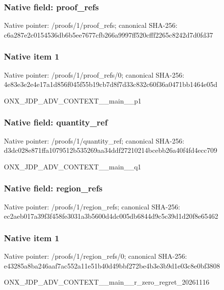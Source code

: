 \documentclass[10pt,a4paper]{article}
\begin{document}
\subsubsection{Native field: proof\_\allowbreak{}refs}
Native pointer: /proofs/1/proof\_\allowbreak{}refs; canonical SHA-256: c6a287e2c0154536db6b5ee7677cfb266a9997ff520cfff2265c8242d7d0fd37

\subsubsection{Native item 1}
Native pointer: /proofs/1/proof\_\allowbreak{}refs/0; canonical SHA-256: 4e83e3e2e4e17a1d856f045f55b19cb7d8f7d33c832c60f36a0471bb1464e05d

\begingroup\raggedright\sloppy ONX\_\allowbreak{}JDP\_\allowbreak{}ADV\_\allowbreak{}CONTEXT\_\allowbreak{}\_\allowbreak{}main\_\allowbreak{}\_\allowbreak{}p1\par\endgroup

\subsubsection{Native field: quantity\_\allowbreak{}ref}
Native pointer: /proofs/1/quantity\_\allowbreak{}ref; canonical SHA-256: d3dc028e871ffa1079512b535269aa34ddf27210214bcebb26a40f4fd4ecc709

\begingroup\raggedright\sloppy ONX\_\allowbreak{}JDP\_\allowbreak{}ADV\_\allowbreak{}CONTEXT\_\allowbreak{}\_\allowbreak{}main\_\allowbreak{}\_\allowbreak{}q1\par\endgroup

\subsubsection{Native field: region\_\allowbreak{}refs}
Native pointer: /proofs/1/region\_\allowbreak{}refs; canonical SHA-256: ec2aeb017a39f3f458fe3031a3b5600d4dc005db6844d9c5c39d1d20f8e65462

\subsubsection{Native item 1}
Native pointer: /proofs/1/region\_\allowbreak{}refs/0; canonical SHA-256: e43285a8ba246aaf7ac552a11e51b40d49bbf272be4b3e3b9d1e03c8e0bf3808

\begingroup\raggedright\sloppy ONX\_\allowbreak{}JDP\_\allowbreak{}ADV\_\allowbreak{}CONTEXT\_\allowbreak{}\_\allowbreak{}main\_\allowbreak{}\_\allowbreak{}r\_\allowbreak{}zero\_\allowbreak{}regret\_\allowbreak{}20261116\par\endgroup
\end{document}
